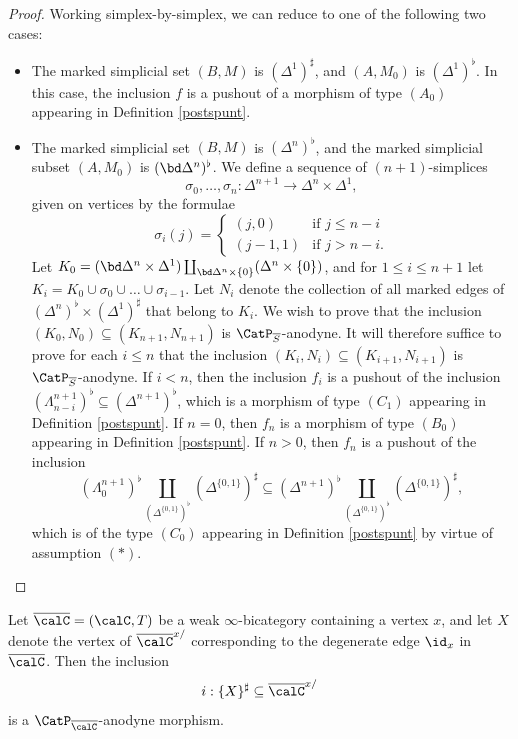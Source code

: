 \begin{proof}
Working simplex-by-simplex, we can reduce to one of the following two cases:
\begin{itemize}
\item The marked simplicial set $(B,M)$ is $(\Delta^1)^{\sharp}$, and 
$(A,M_0)$ is $(\Delta^1)^{\flat}$. In this case, the inclusion $f$ is a pushout of a morphism of type $(A_0)$ appearing in Definition \ref{postspunt}. 

\item The marked simplicial set $(B,M)$ is $(\Delta^n)^{\flat}$, and the marked simplicial subset
$(A,M_0)$ is $( \bd \Delta^n)^{\flat}$. We define a sequence of $(n+1)$-simplices
$$ \sigma_0, \ldots, \sigma_n: \Delta^{n+1} \rightarrow \Delta^n \times \Delta^1,$$
given on vertices by the formulae
$$ \sigma_i(j) = \begin{cases} (j,0) & \text{if } j \leq n-i \\
(j-1, 1) & \text{if } j > n-i. \end{cases}$$
Let $K_0 = (\bd \Delta^n \times \Delta^1) \coprod_{ \bd \Delta^n \times \{0\} } ( \Delta^n \times \{0\})$,
and for $1 \leq i \leq n+1$ let $K_i = K_0 \cup \sigma_0 \cup \ldots \cup \sigma_{i-1}$.
Let $N_i$ denote the collection of all marked edges of $(\Delta^n)^{\flat} \times (\Delta^1)^{\sharp}$ that belong to $K_i$. We wish to prove that the inclusion $(K_0, N_0) \subseteq (K_{n+1}, N_{n+1})$
is $\CatP_{\overline{S}}$-anodyne. It will therefore suffice to prove for each
$i \leq n$ that the inclusion $(K_i, N_i) \subseteq (K_{i+1}, N_{i+1})$ is $\CatP_{\overline{S}}$-anodyne. If $i < n$, then the inclusion $f_i$ is a pushout of the inclusion
$(\Lambda^{n+1}_{n-i})^{\flat} \subseteq (\Delta^{n+1})^{\flat}$, which is a morphism of type
$(C_1)$ appearing in Definition \ref{postspunt}.
If $n=0$, then $f_{n}$ is a morphism of type $(B_0)$ appearing in Definition \ref{postspunt}.
If $n > 0$, then $f_{n}$ is a pushout of the inclusion
$$( \Lambda^{n+1}_0)^{\flat} \coprod_{ (\Delta^{ \{0,1\} })^{\flat} } (\Delta^{ \{0,1\} })^{\sharp}
\subseteq (\Delta^{n+1})^{\flat} \coprod_{ (\Delta^{ \{0,1\} })^{\flat} } ( \Delta^{ \{0,1\}})^{\sharp},$$
which is of the type $(C_0)$ appearing in Definition \ref{postspunt} by virtue of assumption $(\ast)$.
\end{itemize}
\end{proof}

\begin{proposition}\label{cast2}
Let $\overline{\calC} = (\calC, T)$ be a weak $\infty$-bicategory containing a vertex $x$, and let
$X$ denote the vertex of $\overline{\calC}^{x/}$ corresponding to the degenerate edge
$\id_{x}$ in $\overline{\calC}$. Then the inclusion
$$ i: \{ X \}^{\sharp} \subseteq \overline{\calC}^{x/}$$
is a $\CatP_{\overline{\calC}}$-anodyne morphism.
\end{proposition}

